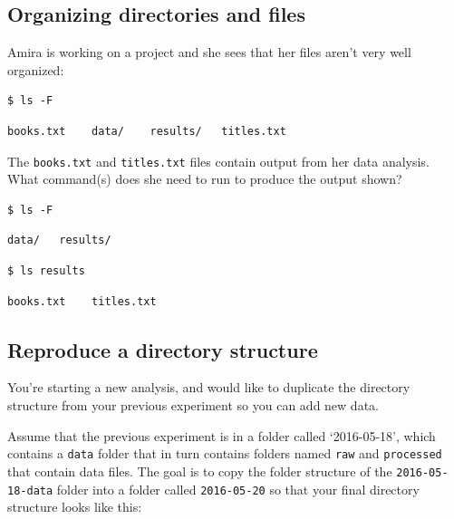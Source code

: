 \documentclass[
]{krantz}
\begin{document}
\hypertarget{bash-basics-ex-organizing}{%
\subsection{Organizing directories and files}\label{bash-basics-ex-organizing}}

Amira is working on a project and she sees that her files aren't very well
organized:

\begin{verbatim}
$ ls -F
\end{verbatim}

\begin{verbatim}
books.txt    data/    results/   titles.txt
\end{verbatim}

The \texttt{books.txt} and \texttt{titles.txt} files contain output from her data
analysis. What command(s) does she need to run
to produce the output shown?

\begin{verbatim}
$ ls -F
\end{verbatim}

\begin{verbatim}
data/   results/
\end{verbatim}

\begin{verbatim}
$ ls results
\end{verbatim}

\begin{verbatim}
books.txt    titles.txt
\end{verbatim}

\hypertarget{bash-basics-ex-reproduce-structure}{%
\subsection{Reproduce a directory structure}\label{bash-basics-ex-reproduce-structure}}

You're starting a new analysis, and would like to duplicate the directory
structure from your previous experiment so you can add new data.

Assume that the previous experiment is in a folder called `2016-05-18',
which contains a \texttt{data} folder that in turn contains folders named \texttt{raw} and
\texttt{processed} that contain data files. The goal is to copy the folder structure
of the \texttt{2016-05-18-data} folder into a folder called \texttt{2016-05-20}
so that your final directory structure looks like this:
\end{document}
